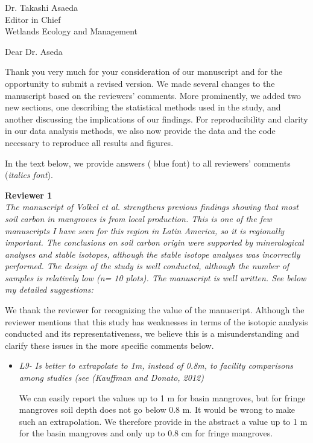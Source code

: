 \documentclass[11pt]{bgcletter}
\begin{document}
\begin{letter}{Dr. Takashi Asaeda\\
 Editor in Chief \\ Wetlands Ecology and Management}

\opening{Dear Dr. Aseda}
Thank you very much for your consideration of our manuscript and for the opportunity to submit a revised version. We made several changes to the manuscript based on the reviewers' comments. More prominently, we added two new sections, one describing the statistical methods used in the study, and another discussing the implications of our findings. For reproducibility and clarity in our data analysis methods, we also now provide the data and the code necessary to reproduce all results and figures. 

 In the text below, we provide answers ({\color{blue} blue font}) to all reviewers' comments ({\it italics font}). 

{\bf Reviewer 1} \\
{\it The manuscript of Volkel et al. strengthens previous findings showing that most soil carbon in mangroves is from local production. This is one of the few manuscripts I have seen for this region in Latin America, so it is regionally important. The conclusions on soil carbon origin were supported by mineralogical analyses and stable isotopes, although the stable isotope analyses was incorrectly performed. The design of the study is well conducted, although the number of samples is relatively low (n= 10 plots). The manuscript is well written. See below my detailed suggestions:}

{\color{blue} We thank the reviewer for recognizing the value of the manuscript. Although the reviewer mentions that this study has weaknesses in terms of the isotopic analysis conducted and its representativeness, we believe this is a misunderstanding and clarify these issues in the more specific comments below. }

\begin{itemize}
\item {\it L9- Is better to extrapolate to 1m, instead of 0.8m, to facility comparisons among studies (see (Kauffman and Donato, 2012)}

{\color{blue} We can easily report the values up to 1 m for basin mangroves, but for fringe mangroves soil depth does not go below 0.8 m. It would be wrong to make such an extrapolation. We therefore provide in the abstract a value up to 1 m for the basin mangroves and only up to 0.8 cm for fringe mangroves.}


\end{itemize}
\end{letter}
\end{document}
